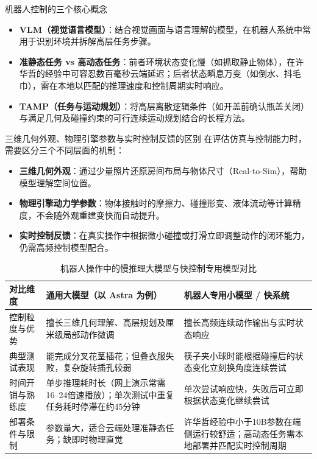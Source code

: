 \documentclass[UTF8,a4paper,11pt,fontset=fandol]{ctexart}
\begin{document}
\begin{knowledgebox}{机器人控制的三个核心概念}
\begin{itemize}
\item \textbf{VLM（视觉语言模型）}：结合视觉画面与语言理解的模型，在机器人系统中常用于识别环境并拆解高层任务步骤。
\item \textbf{准静态任务 vs 高动态任务}：前者环境状态变化慢（如抓取静止物体），在许华哲的经验中可容忍数百毫秒云端延迟；后者状态瞬息万变（如倒水、抖毛巾），需在本地以匹配的推理速度和控制周期实时响应。
\item \textbf{TAMP（任务与运动规划）}：将高层离散逻辑条件（如开盖前确认瓶盖关闭）与满足几何及碰撞约束的可行连续运动规划结合的长程方法。
\end{itemize}
\end{knowledgebox}
\begin{warningbox}{三维几何外观、物理引擎参数与实时控制反馈的区别}
在评估仿真与控制能力时，需要区分三个不同层面的机制：
\begin{itemize}
\item \textbf{三维几何外观}：通过少量照片还原房间布局与物体尺寸（Real-to-Sim），帮助模型理解空间位置。
\item \textbf{物理引擎动力学参数}：物体接触时的摩擦力、碰撞形变、液体流动等计算精度，不会随外观重建变快而自动提升。
\item \textbf{实时控制反馈}：在真实操作中根据微小碰撞或打滑立即调整动作的闭环能力，仍需高频控制模型配合。
\end{itemize}
\end{warningbox}
\begin{table}[H]\centering\small
\caption{机器人操作中的慢推理大模型与快控制专用模型对比}
\begin{tabular}{>{\raggedright\arraybackslash}p{\dimexpr(\linewidth-6\tabcolsep)/3\relax}>{\raggedright\arraybackslash}p{\dimexpr(\linewidth-6\tabcolsep)/3\relax}>{\raggedright\arraybackslash}p{\dimexpr(\linewidth-6\tabcolsep)/3\relax}}
\toprule
对比维度 & 通用大模型（以 Astra 为例） & 机器人专用小模型 / 快系统\\\midrule
控制粒度与优势 & 擅长三维几何理解、高层规划及厘米级局部动作微调 & 擅长高频连续动作输出与实时状态响应\\[4pt]
典型测试表现 & 能完成分叉花茎插花；但叠衣服失败，复杂旋转插孔较弱 & 筷子夹小球时能根据碰撞后的状态变化立刻换角度连续尝试\\[4pt]
时间开销与熟练度 & 单步推理耗时长（网上演示常需16–24倍速播放）；单次测试中重复任务耗时停滞在约45分钟 & 单次尝试响应快，失败后可立即根据状态变化继续尝试\\[4pt]
部署条件与限制 & 参数量大，适合云端处理准静态任务；缺即时物理直觉 & 许华哲经验中小于10B参数在端侧运行较舒适；高动态任务需本地部署并匹配实时控制周期\\[4pt]
\bottomrule\end{tabular}\end{table}
\end{document}
